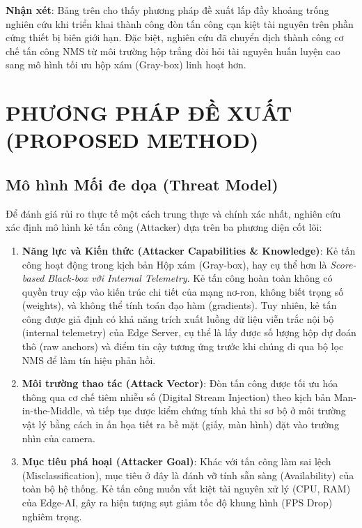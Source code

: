 \documentclass[a4paper,fleqn]{cas-dc}
\begin{document}
\textbf{Nhận xét}: Bảng trên cho thấy phương pháp đề xuất lấp đầy khoảng
trống nghiên cứu khi triển khai thành công đòn tấn công cạn kiệt tài
nguyên trên phần cứng thiết bị biên giới hạn. Đặc biệt, nghiên cứu đã
chuyển dịch thành công cơ chế tấn công NMS từ môi trường hộp trắng đòi
hỏi tài nguyên huấn luyện cao sang mô hình tối ưu hộp xám (Gray-box)
linh hoạt hơn.

\section{PHƯƠNG PHÁP ĐỀ XUẤT (PROPOSED METHOD)}



\subsection{Mô hình Mối đe dọa (Threat Model)}



Để đánh giá rủi ro thực tế một cách trung thực và chính xác nhất, nghiên
cứu xác định mô hình kẻ tấn công (Attacker) dựa trên ba phương diện cốt
lõi:

\begin{enumerate}
\def\labelenumi{\arabic{enumi}.}
\item
  \textbf{Năng lực và Kiến thức (Attacker Capabilities \& Knowledge)}:
  Kẻ tấn công hoạt động trong kịch bản Hộp xám (Gray-box), hay cụ thể
  hơn là \emph{Score-based Black-box với Internal Telemetry}. Kẻ tấn
  công hoàn toàn không có quyền truy cập vào kiến trúc chi tiết của mạng
  nơ-ron, không biết trọng số (weights), và không thể tính toán đạo hàm
  (gradients). Tuy nhiên, kẻ tấn công được giả định có khả năng trích
  xuất luồng dữ liệu viễn trắc nội bộ (internal telemetry) của Edge
  Server, cụ thể là lấy được số lượng hộp dự đoán thô (raw anchors) và
  điểm tin cậy tương ứng trước khi chúng đi qua bộ lọc NMS để làm tín
  hiệu phản hồi.
\item
  \textbf{Môi trường thao tác (Attack Vector)}: Đòn tấn công được tối ưu
  hóa thông qua cơ chế tiêm nhiễu số (Digital Stream Injection) theo
  kịch bản Man-in-the-Middle, và tiếp tục được kiểm chứng tính khả thi
  sơ bộ ở môi trường vật lý bằng cách in ấn họa tiết ra bề mặt (giấy,
  màn hình) đặt vào trường nhìn của camera.
\item
  \textbf{Mục tiêu phá hoại (Attacker Goal)}: Khác với tấn công làm sai
  lệch (Misclassification), mục tiêu ở đây là đánh vỡ tính sẵn sàng
  (Availability) của toàn bộ hệ thống. Kẻ tấn công muốn vắt kiệt tài
  nguyên xử lý (CPU, RAM) của Edge-AI, gây ra hiện tượng sụt giảm tốc độ
  khung hình (FPS Drop) nghiêm trọng.
\end{enumerate}
\end{document}
